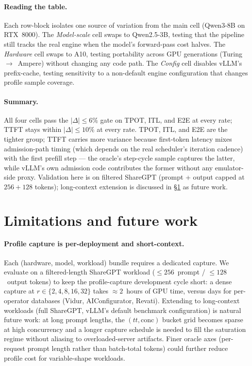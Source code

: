 \documentclass[conference]{IEEEtran}
\begin{document}
\paragraph{Reading the table.} Each row-block isolates one
source of variation from the main cell (Qwen3-8B on
RTX~8000). The \emph{Model-scale} cell swaps to Qwen2.5-3B,
testing that the pipeline still tracks the real engine when
the model's forward-pass cost halves. The \emph{Hardware}
cell swaps to A10, testing portability across GPU
generations (Turing~$\to$~Ampere) without changing any
code path. The \emph{Config} cell disables vLLM's
prefix-cache, testing sensitivity to a non-default engine
configuration that changes profile sample coverage.

\paragraph{Summary.} All four cells pass the
$|\Delta|\le 6\%$ gate on TPOT, ITL, and E2E at every rate;
TTFT stays within $|\Delta|\le 10\%$ at every rate. TPOT,
ITL, and E2E are the tighter group; TTFT carries more
variance because first-token latency mixes admission-path
timing (which depends on the real scheduler's iteration
cadence) with the first prefill step --- the oracle's
step-cycle sample captures the latter, while vLLM's own
admission code contributes the former without any
emulator-side proxy. Validation here is on filtered
ShareGPT (prompt + output capped at $256+128$ tokens);
long-context extension is discussed in
\S\ref{sec:limitations} as future work.

\section{Limitations and future work}
\label{sec:limitations}

\paragraph{Profile capture is per-deployment and short-context.}
Each (hardware, model, workload) bundle requires a dedicated
capture. We evaluate on a filtered-length ShareGPT workload
(${\leq}256$~prompt / ${\leq}128$~output tokens) to keep the
profile-capture development cycle short: a dense capture at
$r\in\{2,4,8,16,32\}$ takes ${\approx}2$~hours of GPU time,
versus days for per-operator databases (Vidur, AIConfigurator,
Revati). Extending to long-context workloads (full ShareGPT,
vLLM's default benchmark configuration) is natural future work:
at long prompt lengths, the $(tt, \text{conc})$ bucket grid
becomes sparse at high concurrency and a longer capture
schedule is needed to fill the saturation regime without
aliasing to overloaded-server artifacts. Finer oracle axes
(per-request prompt length rather than batch-total tokens)
could further reduce profile cost for variable-shape workloads.
\end{document}
